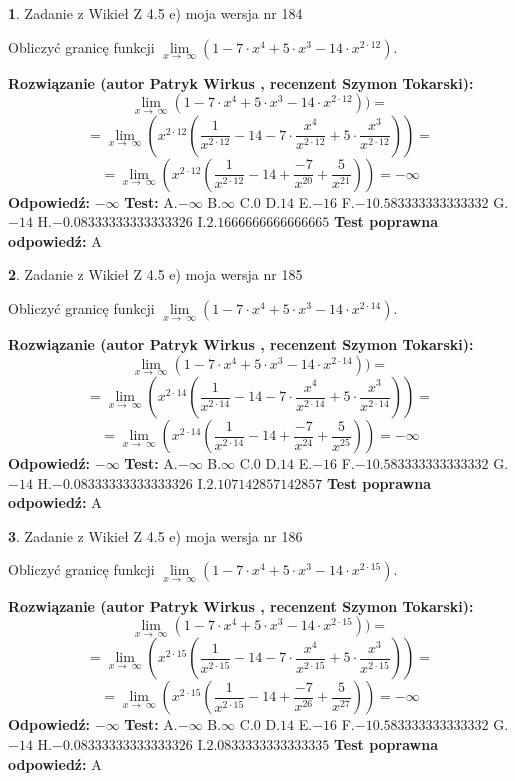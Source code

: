 \documentclass[12pt, a4paper]{article}
\theoremstyle{definition} %
\newtheorem{zad}{}
\newcommand{\zadStart}[1]{\begin{zad}#1\newline}
\newcommand{\zadStop}{\end{zad}}
\newcommand{\rozwStart}[2]{\noindent \textbf{Rozwiązanie (autor #1 , recenzent #2): }\newline}
\newcommand{\rozwStop}{\newline}
\newcommand{\odpStart}{\noindent \textbf{Odpowiedź:}\newline}
\newcommand{\odpStop}{\newline}
\newcommand{\testStart}{\noindent \textbf{Test:}\newline}
\newcommand{\testStop}{\newline}
\newcommand{\kluczStart}{\noindent \textbf{Test poprawna odpowiedź:}\newline}
\newcommand{\kluczStop}{\newline}
\begin{document}
\zadStart{Zadanie z Wikieł Z 4.5 e) moja wersja nr 184}


Obliczyć granicę funkcji  $\lim\limits_{x\to\ \infty}(1 - 7 \cdot x^{4}+5 \cdot x^{3}- 14 \cdot x^{2\cdot12})$.
\zadStop
\rozwStart{Patryk Wirkus}{Szymon Tokarski}
$$\lim\limits_{x\to\ \infty}(1 - 7 \cdot x^{4}+5 \cdot x^{3}- 14 \cdot x^{2\cdot12}))=$$
$$=\lim\limits_{x\to\ \infty}(x^{2\cdot12}(\frac{1}{x^{2\cdot12}}-14 -7 \cdot \frac{x^{4}}{x^{2\cdot12}}+5 \cdot \frac{x^{3}}{x^{2\cdot12}}))=$$
$$=\lim\limits_{x\to\ \infty}(x^{2\cdot12}(\frac{1}{x^{2\cdot12}}-14 + \frac{-7}{x^{20}}+ \frac{5}{x^{21}}))=-\infty$$
\rozwStop
\odpStart
$-\infty$
\odpStop
\testStart
A.$-\infty$ B.$\infty$ C.$0$ D.$14$ E.$-16$
F.$-10.583333333333332$ G.$-14$
H.$-0.08333333333333326$
I.$2.1666666666666665$
\testStop
\kluczStart
A
\kluczStop



\zadStart{Zadanie z Wikieł Z 4.5 e) moja wersja nr 185}


Obliczyć granicę funkcji  $\lim\limits_{x\to\ \infty}(1 - 7 \cdot x^{4}+5 \cdot x^{3}- 14 \cdot x^{2\cdot14})$.
\zadStop
\rozwStart{Patryk Wirkus}{Szymon Tokarski}
$$\lim\limits_{x\to\ \infty}(1 - 7 \cdot x^{4}+5 \cdot x^{3}- 14 \cdot x^{2\cdot14}))=$$
$$=\lim\limits_{x\to\ \infty}(x^{2\cdot14}(\frac{1}{x^{2\cdot14}}-14 -7 \cdot \frac{x^{4}}{x^{2\cdot14}}+5 \cdot \frac{x^{3}}{x^{2\cdot14}}))=$$
$$=\lim\limits_{x\to\ \infty}(x^{2\cdot14}(\frac{1}{x^{2\cdot14}}-14 + \frac{-7}{x^{24}}+ \frac{5}{x^{25}}))=-\infty$$
\rozwStop
\odpStart
$-\infty$
\odpStop
\testStart
A.$-\infty$ B.$\infty$ C.$0$ D.$14$ E.$-16$
F.$-10.583333333333332$ G.$-14$
H.$-0.08333333333333326$
I.$2.107142857142857$
\testStop
\kluczStart
A
\kluczStop



\zadStart{Zadanie z Wikieł Z 4.5 e) moja wersja nr 186}


Obliczyć granicę funkcji  $\lim\limits_{x\to\ \infty}(1 - 7 \cdot x^{4}+5 \cdot x^{3}- 14 \cdot x^{2\cdot15})$.
\zadStop
\rozwStart{Patryk Wirkus}{Szymon Tokarski}
$$\lim\limits_{x\to\ \infty}(1 - 7 \cdot x^{4}+5 \cdot x^{3}- 14 \cdot x^{2\cdot15}))=$$
$$=\lim\limits_{x\to\ \infty}(x^{2\cdot15}(\frac{1}{x^{2\cdot15}}-14 -7 \cdot \frac{x^{4}}{x^{2\cdot15}}+5 \cdot \frac{x^{3}}{x^{2\cdot15}}))=$$
$$=\lim\limits_{x\to\ \infty}(x^{2\cdot15}(\frac{1}{x^{2\cdot15}}-14 + \frac{-7}{x^{26}}+ \frac{5}{x^{27}}))=-\infty$$
\rozwStop
\odpStart
$-\infty$
\odpStop
\testStart
A.$-\infty$ B.$\infty$ C.$0$ D.$14$ E.$-16$
F.$-10.583333333333332$ G.$-14$
H.$-0.08333333333333326$
I.$2.0833333333333335$
\testStop
\kluczStart
A
\kluczStop
\end{document}
